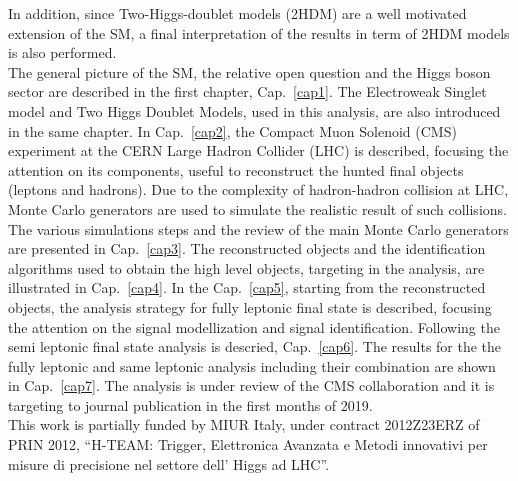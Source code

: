 \documentclass[PhD,binding=0.6cm]{../sapthesis}
\begin{document}
In addition, since  Two-Higgs-doublet models (2HDM)  are a well motivated extension of the SM, a final interpretation of the results in term of 2HDM models is also performed.\\
\newline
The general picture of the SM,  the relative open question and the Higgs boson sector  are described in the first chapter, Cap.~\ref{cap1}. 
The  Electroweak  Singlet model and Two Higgs Doublet Models, used in this analysis, are also introduced in the same chapter. 
In Cap.~\ref{cap2}, the Compact Muon Solenoid (CMS) experiment at the CERN Large Hadron Collider (LHC) is described, focusing the attention on its
components, useful to reconstruct the hunted final objects (leptons and hadrons).
Due to the complexity of  hadron-hadron collision at LHC, Monte Carlo generators are used to simulate the realistic result of such  collisions. 
The various simulations steps and the review of the main Monte Carlo generators are presented in Cap.~\ref{cap3}.
The reconstructed objects and the identification algorithms used to obtain the high level objects, targeting in the analysis, are illustrated in Cap.~\ref{cap4}.
In the Cap.~\ref{cap5}, starting from the reconstructed objects, the analysis strategy for fully leptonic final state  is described, focusing the attention on the signal  modellization and signal identification.
Following the semi leptonic final state  analysis is descried, Cap.~\ref{cap6}.
The results for the the fully leptonic and same leptonic analysis including their combination are shown in Cap.~\ref{cap7}.
The analysis is under review of the CMS collaboration and it is targeting to journal publication in the first months of 2019.\\
\newline
This work is partially funded by MIUR Italy, under contract 2012Z23ERZ of PRIN 2012, ``H-TEAM: Trigger, Elettronica Avanzata e Metodi innovativi per misure di precisione nel settore dell’ Higgs ad LHC''.

\mainmatter


{} 
{} 
{} 
{} 
{} 
{}
{}
{}
{}
{}
{} 
\end{document}
